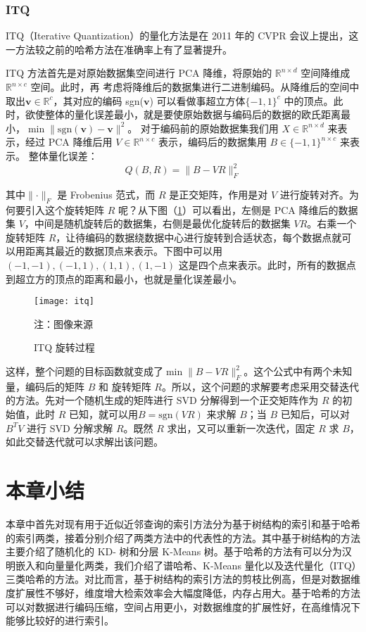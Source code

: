 \subsubsection{ITQ}
ITQ（Iterative Quantization）\cite{YunchaoGong:2011:IQP:2191740.2191779}的量化方法是在 2011 年的 CVPR 会议上提出，这一方法较之前的哈希方法在准确率上有了显著提升。

ITQ 方法首先是对原始数据集空间进行 PCA 降维，将原始的 $\mathbb{R}^{n\times d}$ 空间降维成 $\mathbb{R}^{n\times c}$ 空间。此时，再
考虑将降维后的数据集进行二进制编码。从降维后的空间中取出$\mathbf{v}\in \mathbb{R}^{c}$，其对应的编码 sgn($\mathbf{v}$) 可以看做事超立方体$\{-1,1\}^c$
中的顶点。此时，欲使整体的量化误差最小，就是要使原始数据与编码后的数据的欧氏距离最小，$\min{\lVert \mathrm{sgn}(\mathbf{v})-\mathbf{v}\rVert ^2}$。
对于编码前的原始数据集我们用 $X \in \mathbb{R}^{n\times d}$ 来表示，经过 PCA 降维后用 $V \in \mathbb{R}^{n\times c}$ 表示，编码后的数据集用 $B \in \{-1,1\}^{n\times c}$ 来表示。
整体量化误差：
\begin{equation}
Q(B, R) = \lVert B - VR \rVert_F ^2
\end{equation}

其中$\lVert \cdot \rVert_F$ 是 Frobenius 范式，而 $R$ 是正交矩阵，作用是对 $V$ 进行旋转对齐。为何要引入这个旋转矩阵 $R$ 呢？从下图（\ref{fig:itq}）可以看出，左侧是 PCA 降维后的数据集 $V$，中间是随机旋转后的数据集，右侧是最优化旋转后的数据集 $VR$。右乘一个旋转矩阵 $R$，让待编码的数据绕数据中心进行旋转到合适状态，每个数据点就可以用距离其最近的数据顶点来表示。下图中可以用 $(-1, -1), (-1, 1), (1, 1), (1, -1) $ 这是四个点来表示。此时，所有的数据点到超立方的顶点的距离和最小，也就是量化误差最小。
\begin{figure}[H]
  \centering
  \texttt{[image: itq]}
  \caption{ITQ 旋转过程}
  \label{fig:itq}
  \footnotesize 注：图像来源\cite{YunchaoGong:2011:IQP:2191740.2191779}
\end{figure}
这样，整个问题的目标函数就变成了$\min \lVert B - VR \rVert_F ^2$。这个公式中有两个未知量，编码后的矩阵 $B$ 和 旋转矩阵 $R$。所以，这个问题的求解要考虑采用交替迭代的方法。先对一个随机生成的矩阵进行 SVD 分解得到一个正交矩阵作为 $R$ 的初始值，此时 $R$ 已知，就可以用$ B= \mathrm{sgn}(VR)$ 来求解 $B$；当 $B$ 已知后，可以对 $B^TV$ 进行 SVD 分解求解 $R$。既然 $R$ 求出，又可以重新一次迭代，固定 $R$ 求 $B$，如此交替迭代就可以求解出该问题。

\section{本章小结}
本章中首先对现有用于近似近邻查询的索引方法分为基于树结构的索引和基于哈希的索引两类，接着分别介绍了两类方法中的代表性的方法。其中基于树结构的方法主要介绍了随机化的 KD- 树和分层 K-Means 树。基于哈希的方法有可以分为汉明嵌入和向量量化两类，我们介绍了谱哈希、K-Means 量化以及迭代量化（ITQ）三类哈希的方法。对比而言，基于树结构的索引方法的剪枝比例高，但是对数据维度扩展性不够好，维度增大检索效率会大幅度降低，内存占用大。基于哈希的方法可以对数据进行编码压缩，空间占用更小，对数据维度的扩展性好，在高维情况下能够比较好的进行索引。
